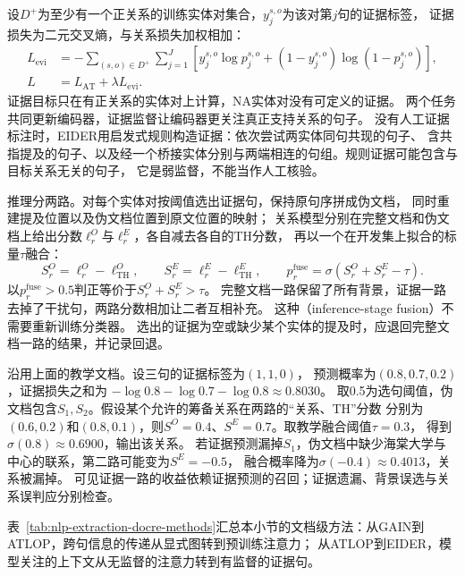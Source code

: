 设$D^+$为至少有一个正关系的训练实体对集合，$y_j^{s,o}$为该对第$j$句的证据标签，
证据损失为二元交叉熵，与关系损失加权相加：
\begin{equation}
  \begin{aligned}
    L_{\mathrm{evi}}
      &=-\sum_{(s,o)\in D^+}\sum_{j=1}^{J}
      \left[y_j^{s,o}\log p_j^{s,o}
       +(1-y_j^{s,o})\log(1-p_j^{s,o})\right],\\
    L&=L_{\mathrm{AT}}+\lambda L_{\mathrm{evi}}.
  \end{aligned}
  \label{eq:nlp-extraction-eider-loss}
\end{equation}
证据目标只在有正关系的实体对上计算，NA实体对没有可定义的证据。
两个任务共同更新编码器，证据监督让编码器更关注真正支持关系的句子。
没有人工证据标注时，EIDER用启发式规则构造证据：依次尝试两实体同句共现的句子、
含共指提及的句子、以及经一个桥接实体分别与两端相连的句组。规则证据可能包含与目标关系无关的句子，
它是弱监督，不能当作人工核验。

推理分两路。对每个实体对按阈值选出证据句，保持原句序拼成伪文档，
同时重建提及位置以及伪文档位置到原文位置的映射；
关系模型分别在完整文档和伪文档上给出分数$\ell_r^O$与$\ell_r^E$，各自减去各自的TH分数，
再以一个在开发集上拟合的标量$\tau$融合：
\begin{equation}
  S_r^O=\ell_r^O-\ell_{\mathrm{TH}}^O,\qquad
  S_r^E=\ell_r^E-\ell_{\mathrm{TH}}^E,\qquad
  p_r^{\mathrm{fuse}}=\sigma(S_r^O+S_r^E-\tau).
  \label{eq:nlp-extraction-eider-fusion}
\end{equation}
以$p_r^{\mathrm{fuse}}>0.5$判正等价于$S_r^O+S_r^E>\tau$。
完整文档一路保留了所有背景，证据一路去掉了干扰句，两路分数相加让二者互相补充。
这种（inference-stage fusion）不需要重新训练分类器。
选出的证据为空或缺少某个实体的提及时，应退回完整文档一路的结果，并记录回退。

沿用上面的教学文档。设三句的证据标签为$(1,1,0)$，
预测概率为$(0.8,0.7,0.2)$，证据损失之和为
$-\log0.8-\log0.7-\log0.8\approx0.8030$。
取0.5为选句阈值，伪文档包含$S_1,S_2$。假设某个允许的筹备关系在两路的“关系、TH”分数
分别为$(0.6,0.2)$和$(0.8,0.1)$，则$S^O=0.4$、$S^E=0.7$。取教学融合阈值$\tau=0.3$，
得到$\sigma(0.8)\approx0.6900$，输出该关系。
若证据预测漏掉$S_1$，伪文档中缺少海棠大学与中心的联系，第二路可能变为$S^E=-0.5$，
融合概率降为$\sigma(-0.4)\approx0.4013$，关系被漏掉。
可见证据一路的收益依赖证据预测的召回；证据遗漏、背景误选与关系误判应分别检查。

表~\ref{tab:nlp-extraction-docre-methods}汇总本小节的文档级方法：从GAIN到ATLOP，跨句信息的传递从显式图转到预训练注意力；
从ATLOP到EIDER，模型关注的上下文从无监督的注意力转到有监督的证据句。

